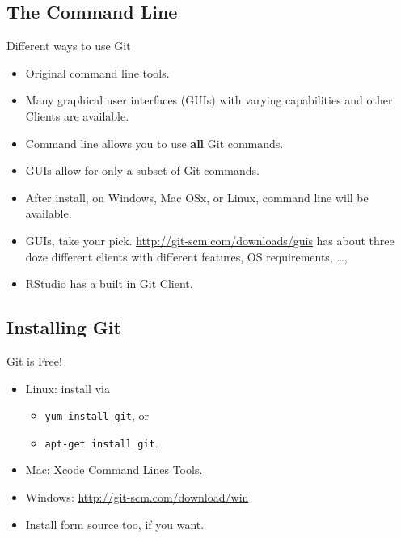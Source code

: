 \subsection{The Command Line}
\begin{frame}[t]{Different ways to use Git}
  \begin{itemize}
    \item Original command line tools.
    \item Many graphical user interfaces (GUIs) with varying capabilities and
      other Clients are available.

    \item Command line allows you to use {\bf all} Git commands.
    \item GUIs allow for only a subset of Git commands.

    \item After install, on Windows, Mac OSx, or Linux, command line will be
      available.
    \item GUIs, take your pick. \url{http://git-scm.com/downloads/guis} has
      about three doze different clients with different features, OS
      requirements, \ldots, 
    \item RStudio has a built in Git Client.
  \end{itemize}
\end{frame}

\subsection{Installing Git}
\begin{frame}[t]{Git is Free!}
  \begin{itemize}
    \item Linux: install via 
      \begin{itemize}
        \item {\tt yum install git}, or
        \item {\tt apt-get install git}.
      \end{itemize}
    \item Mac: Xcode Command Lines Tools.
    \item Windows: \url{http://git-scm.com/download/win}
    \item Install form source too, if you want.
  \end{itemize}
\end{frame}

